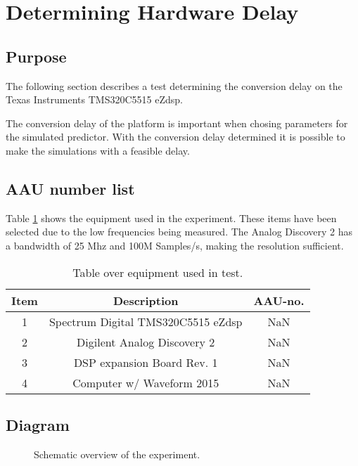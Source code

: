 \section{Determining Hardware Delay} \label{sec:HardwareDelay}

\subsection{Purpose}
The following section describes a test determining the conversion delay on the Texas Instruments TMS320C5515 eZdsp.

The conversion delay of the platform is important when chosing parameters for the simulated predictor. With the conversion delay determined it is possible to  make the simulations with a feasible delay. 

\subsection{AAU number list}
Table \ref{tab:MeasDelayTable} shows the equipment used in the experiment. These items have been selected due to the low frequencies being measured. The Analog Discovery 2 has a bandwidth of 25 Mhz and 100M Samples/s, making the resolution sufficient.  
\begin{table}[H]
	\centering
	\begin{tabular}{ c c c } \toprule
		{Item}	& {Description} 						& {AAU-no}. \\ \bottomrule 
		1	&	Spectrum Digital TMS320C5515 eZdsp	& NaN	\\
		2	&	Digilent Analog Discovery 2	& NaN		\\
		3	&	DSP expansion Board Rev. 1 & NaN		\\
		4	&	Computer w/ Waveform 2015					& NaN		\\
		\bottomrule
	\end{tabular}
	\caption{Table over equipment used in test.}
	\label{tab:MeasDelayTable}
\end{table}

\subsection{Diagram}

\begin{figure}[H]
	\centering
	
	\caption{Schematic overview of the experiment.}
	\label{fig:SchematicDelayExperiment}
\end{figure}

